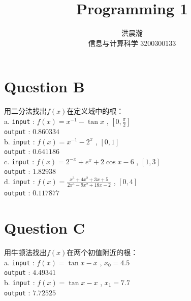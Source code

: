 \documentclass{ctexart}
\title{Programming 1}
\author{洪晨瀚 \\ 信息与计算科学 3200300133}
\begin{document}
\maketitle

\section*{Question B}
\begin{flushleft}
  用二分法找出$f(x)$在定义域中的根：\\
  a. \verb|input| : $f(x) = x^{-1} - \tan x$ , $[0,\frac{\pi}{2}]$ \\
  \quad \verb|output| : $0.860334$ \\
 
  b. \verb|input| : $f(x) = x^{-1} - 2^x$ , $[0,1]$ \\
  \quad \verb|output| : $0.641186$ \\

  c. \verb|input| : $f(x) = 2^{-x} + e^x + 2\cos x - 6$ , $[1,3]$ \\
  \quad \verb|output| : $1.82938$ \\

  d. \verb|input| : $f(x) = \frac{x^3 + 4x^2 + 3x + 5}{2x^3 - 9x^2 + 18x -2}$ , $[0,4]$ \\
  \quad \verb|output| : $0.117877$ \\ 
\end{flushleft}

\section*{Question C}
\begin{flushleft}
  用牛顿法找出$f(x)$在两个初值附近的根：\\
  a. \verb|input| : $f(x) = \tan x - x$ , $x_0 = 4.5$ \\
  \quad \verb|output| : $4.49341$ \\
 
  b. \verb|input| : $f(x) = \tan x - x$ , $x_1 = 7.7$ \\
  \quad \verb|output| : $7.72525$ \\
\end{flushleft}

\clearpage
\end{document}
